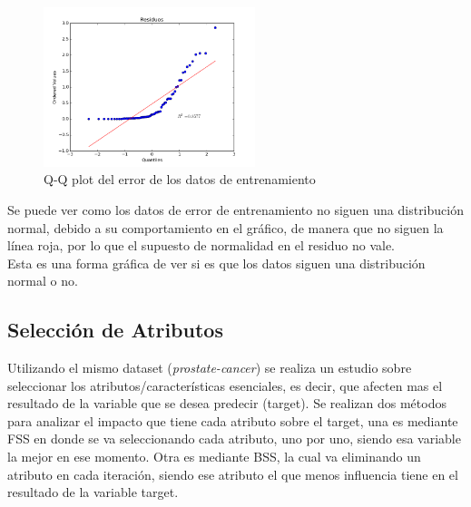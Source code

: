 \documentclass[10pt]{article}
\begin{document}
\begin{itemize}
\begin{figure}[h]
    \centering
    \includegraphics[width=0.55\textwidth]{images/qqplot}
    \caption{Q-Q plot del error de los datos de entrenamiento}
    \label{fig:mesh1}
\end{figure}

Se puede ver como los datos de error de entrenamiento no siguen una distribución normal, debido a su comportamiento en el gráfico, de manera que no siguen la línea roja, por lo que el supuesto de normalidad en el residuo no vale.\\
Esta es una forma gráfica de ver si es que los datos siguen una distribución normal o no.

\end{itemize}

\subsection{Selección de Atributos}
Utilizando el mismo dataset (\textit{prostate-cancer}) se realiza un estudio sobre seleccionar los atributos/características esenciales, es decir, que afecten mas el resultado de la variable que se desea predecir (target). Se realizan dos métodos para analizar el impacto que tiene cada atributo sobre el target, una es mediante FSS en donde se va seleccionando cada atributo, uno por uno, siendo esa variable la mejor en ese momento. Otra es mediante BSS, la cual va eliminando un atributo en cada iteración, siendo ese atributo el que menos influencia tiene en el resultado de la variable target.
\end{document}
